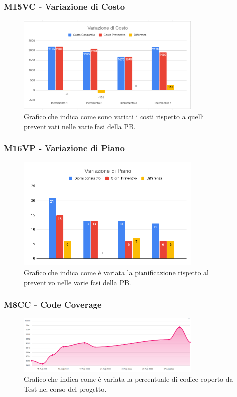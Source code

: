 \subsubsection{M15VC - Variazione di Costo}
\begin{figure}[H]
    \centering\includegraphics[width=0.8\textwidth, height=0.8\textheight,keepaspectratio]{images/PB-Variazione-di-Costo-2.png}
    \caption{Grafico che indica come sono variati i costi rispetto a quelli preventivati nelle varie fasi della PB.}
\end{figure}    

\subsubsection{M16VP - Variazione di Piano}
\begin{figure}[H]
    \centering\includegraphics[width=0.8\textwidth, height=0.8\textheight,keepaspectratio]{images/PB-Variazione-di-Piano-3.png}
    \caption{Grafico che indica come è variata la pianificazione rispetto al preventivo nelle varie fasi della PB.}
\end{figure}  

\subsubsection{M8CC - Code Coverage}
\begin{figure}[H]
    \centering\includegraphics[width=0.8\textwidth, height=0.8\textheight,keepaspectratio]{images/PB-Code-Coverage.png}
    \caption{Grafico che indica come è variata la percentuale di codice coperto da Test nel corso del progetto.}
\end{figure}  

